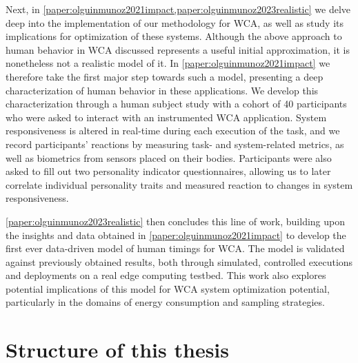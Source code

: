 Next, in \cref{paper:olguinmunoz2021impact,paper:olguinmunoz2023realistic} we delve deep into the implementation of our methodology for \gls{WCA}, as well as study its implications for optimization of these systems.
Although the above approach to human behavior in \gls{WCA} discussed represents a useful initial approximation, it is nonetheless not a realistic model of it.
In \cref{paper:olguinmunoz2021impact} we therefore take the first major step towards such a model, presenting a deep characterization of human behavior in these applications.
We develop this characterization through a human subject study with a cohort of \num{40} participants who were asked to interact with an instrumented \gls{WCA} application.
System responsiveness is altered in real-time during each execution of the task, and we record participants' reactions by measuring task- and system-related metrics, as well as biometrics from sensors placed on their bodies.
Participants were also asked to fill out two personality indicator questionnaires, allowing us to later correlate individual personality traits and measured reaction to changes in system responsiveness.

\cref{paper:olguinmunoz2023realistic} then concludes this line of work, building upon the insights and data obtained in \cref{paper:olguinmunoz2021impact} to develop the first ever data-driven model of human timings for \gls{WCA}.
The model is validated against previously obtained results, both through simulated, controlled executions and deployments on a real edge computing testbed.
This work also explores potential implications of this model for \gls{WCA} system optimization potential, particularly in the domains of energy consumption and sampling strategies.

\section{Structure of this thesis}

